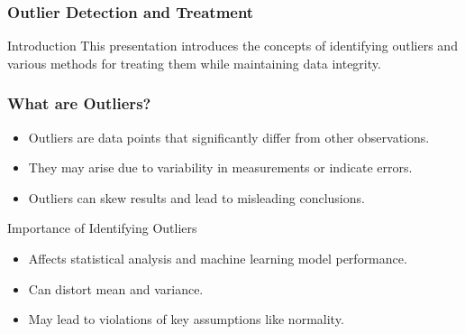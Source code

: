 \documentclass[aspectratio=169]{beamer}
\begin{document}
\begin{frame}[fragile]
    \frametitle{Outlier Detection and Treatment}
    \begin{block}{Introduction}
        This presentation introduces the concepts of identifying outliers and various methods for treating them while maintaining data integrity.
    \end{block}
\end{frame}

\begin{frame}[fragile]
    \frametitle{What are Outliers?}
    \begin{itemize}
        \item Outliers are data points that significantly differ from other observations.
        \item They may arise due to variability in measurements or indicate errors.
        \item Outliers can skew results and lead to misleading conclusions.
    \end{itemize}
    \begin{block}{Importance of Identifying Outliers}
        \begin{itemize}
            \item Affects statistical analysis and machine learning model performance.
            \item Can distort mean and variance.
            \item May lead to violations of key assumptions like normality.
        \end{itemize}
    \end{block}
\end{frame}
\end{document}
